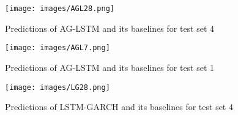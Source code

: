 

\begin{figure}
  \vspace{-10pt}
  \begin{center}
\texttt{[image: images/AGL28.png]}
  \end{center}
  \vspace{-10pt}
  \caption{\footnotesize Predictions of AG-LSTM and its baselines for test set 4}
\label{AGL28}
  \vspace{-10pt}
\end{figure}

\begin{figure}
  \vspace{-10pt}
  \begin{center}
\texttt{[image: images/AGL7.png]}
  \end{center}
  \vspace{-10pt}
  \caption{\footnotesize Predictions of AG-LSTM and its baselines for test set 1}
\label{AGL7}
  \vspace{-10pt}
\end{figure}

\begin{figure}
  \vspace{0pt}
  \begin{center}
\texttt{[image: images/LG28.png]}
  \end{center}
  \vspace{-10pt}
  \caption{\footnotesize Predictions of LSTM-GARCH and its baselines for test set 4}
\label{LG28}
  \vspace{-20pt}
\end{figure}


